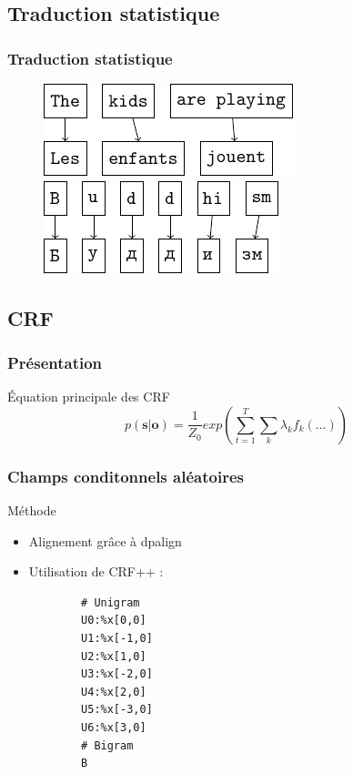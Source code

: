 \documentclass{beamer}
\begin{document}
\subsection{Traduction statistique}
\begin{frame}
\tableofcontents[currentsection]
\end{frame}
\begin{frame}
    \frametitle{Traduction statistique}
    \begin{figure}[H]
        \label{translation_alignment}
        \centering
        \vspace{0.3cm}
        \includegraphics{word_alignment.pdf}
        \hspace{0.5cm}
        \includegraphics{letter_alignment.pdf}
    \end{figure}
\end{frame}

\subsection{CRF}

\begin{frame}
\frametitle{Présentation}
\begin{block}{Équation principale des CRF}
\begin{equation}
p(\textbf{s}|\textbf{o}) = \frac{1}{Z_0}exp(\sum_{t=1}^T\sum_k \lambda_k f_k(...))
\label{eqcrf}
\end{equation}
\end{block}
\end{frame}

\begin{frame}[fragile]
\frametitle{Champs conditonnels aléatoires}
	\begin{block}{Méthode}
		\begin{itemize}
		\item Alignement grâce à dpalign
		\item Utilisation de CRF++ :
		{\scriptsize \begin{verbatim}
		# Unigram
		U0:%x[0,0]
		U1:%x[-1,0]
		U2:%x[1,0]
		U3:%x[-2,0]
		U4:%x[2,0]
		U5:%x[-3,0]
		U6:%x[3,0]
		# Bigram
		B
		\end{verbatim}}
		\end{itemize}
	\end{block}
\end{frame}
\end{document}
